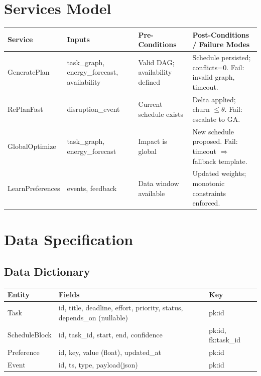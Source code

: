 \documentclass[12pt,oneside]{report}
\begin{document}
\chapter{Services Model}
\begin{longtable}{@{}p{3.2cm}p{3.2cm}p{4.2cm}p{4.2cm}@{}}
\toprule
\textbf{Service} & \textbf{Inputs} & \textbf{Pre-Conditions} & \textbf{Post-Conditions / Failure Modes} \\
\midrule
GeneratePlan & task\_graph, energy\_forecast, availability & Valid DAG; availability defined & Schedule persisted; conflicts=0. Fail: invalid graph, timeout. \\
RePlanFast & disruption\_event & Current schedule exists & Delta applied; churn $\le \theta$. Fail: escalate to GA. \\
GlobalOptimize & task\_graph, energy\_forecast & Impact is global & New schedule proposed. Fail: timeout $\Rightarrow$ fallback template. \\
LearnPreferences & events, feedback & Data window available & Updated weights; monotonic constraints enforced. \\
\bottomrule
\end{longtable}

\chapter{Data Specification}
\section{Data Dictionary}
\begin{longtable}{@{}p{3.2cm}p{8.6cm}p{2.0cm}@{}}
\toprule
\textbf{Entity} & \textbf{Fields} & \textbf{Key} \\
\midrule
Task & id, title, deadline, effort, priority, status, depends\_on (nullable) & pk:id \\
ScheduleBlock & id, task\_id, start, end, confidence & pk:id, fk:task\_id \\
Preference & id, key, value (float), updated\_at & pk:id \\
Event & id, ts, type, payload(json) & pk:id \\
\bottomrule
\end{longtable}
\end{document}
